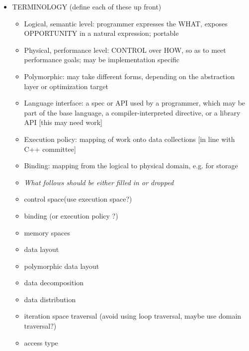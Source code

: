 \begin{itemize}
\item TERMINOLOGY (define each of these up front)
  \begin{itemize}
  \item Logical, semantic level: programmer expresses the WHAT, exposes OPPORTUNITY in a natural expression; portable
  \item Physical, performance level: CONTROL over HOW, so as to meet performance goals; may be implementation specific
  \item Polymorphic: may take different forms, depending on the abstraction layer or optimization target
  \item Language interface: a spec or API used by a programmer, which may be part of the base language, a compiler-interpreted directive, or a library API [this may need work] 
  \item Execution policy: mapping of work onto data collections [in line with C++ committee]
  \item Binding: mapping from the logical to physical domain, e.g. for storage
  \item \em{What follows should be either filled in or dropped}
  \item control space(use execution space?)
  \item binding  (or execution policy ?)
  \item memory spaces
  \item data layout
  \item polymorphic data layout
  \item data decomposition 
  \item data distribution 
  \item iteration space traversal (avoid using loop traversal, maybe use domain traversal?) 
  \item access type
  \end{itemize}



\end{itemize}
